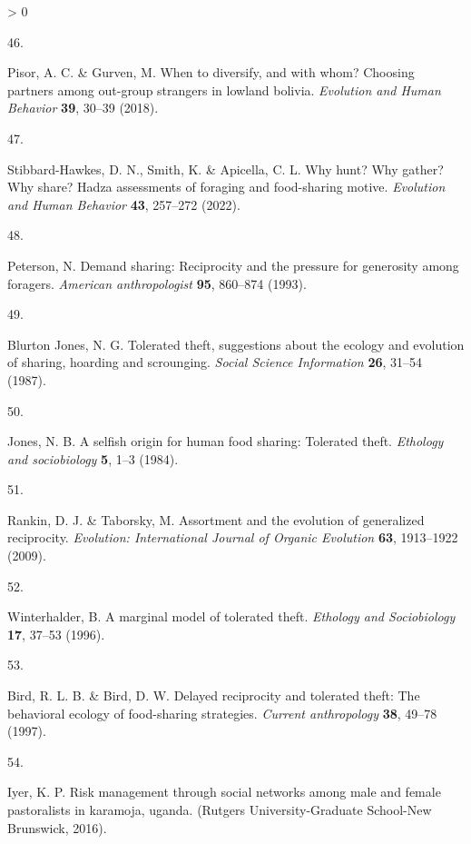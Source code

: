 \documentclass[
]{article}
\newlength{\cslhangindent}
\newlength{\csllabelwidth}
\newenvironment{CSLReferences}[2] %
 {%
  \setlength{\parindent}{0pt}
  \ifodd #1 \everypar{\setlength{\hangindent}{\cslhangindent}}\ignorespaces\fi
  \ifnum #2 > 0
  \setlength{\parskip}{#2\baselineskip}
  \fi
 }%
 {}
\newcommand{\CSLLeftMargin}[1]{\parbox[t]{\csllabelwidth}{#1}}
\newcommand{\CSLRightInline}[1]{\parbox[t]{\linewidth - \csllabelwidth}{#1}\break}
\begin{document}
\begin{CSLReferences}{0}{0}
\leavevmode\hypertarget{ref-pisor2018diversify}{}%
\CSLLeftMargin{46. }
\CSLRightInline{Pisor, A. C. \& Gurven, M. When to diversify, and with whom? Choosing partners among out-group strangers in lowland bolivia. \emph{Evolution and Human Behavior} \textbf{39}, 30--39 (2018).}

\leavevmode\hypertarget{ref-stibbard2022hunt}{}%
\CSLLeftMargin{47. }
\CSLRightInline{Stibbard-Hawkes, D. N., Smith, K. \& Apicella, C. L. Why hunt? Why gather? Why share? Hadza assessments of foraging and food-sharing motive. \emph{Evolution and Human Behavior} \textbf{43}, 257--272 (2022).}

\leavevmode\hypertarget{ref-peterson1993demand}{}%
\CSLLeftMargin{48. }
\CSLRightInline{Peterson, N. Demand sharing: Reciprocity and the pressure for generosity among foragers. \emph{American anthropologist} \textbf{95}, 860--874 (1993).}

\leavevmode\hypertarget{ref-blurton1987tolerated}{}%
\CSLLeftMargin{49. }
\CSLRightInline{Blurton Jones, N. G. Tolerated theft, suggestions about the ecology and evolution of sharing, hoarding and scrounging. \emph{Social Science Information} \textbf{26}, 31--54 (1987).}

\leavevmode\hypertarget{ref-jones1984selfish}{}%
\CSLLeftMargin{50. }
\CSLRightInline{Jones, N. B. A selfish origin for human food sharing: Tolerated theft. \emph{Ethology and sociobiology} \textbf{5}, 1--3 (1984).}

\leavevmode\hypertarget{ref-rankin2009assortment}{}%
\CSLLeftMargin{51. }
\CSLRightInline{Rankin, D. J. \& Taborsky, M. Assortment and the evolution of generalized reciprocity. \emph{Evolution: International Journal of Organic Evolution} \textbf{63}, 1913--1922 (2009).}

\leavevmode\hypertarget{ref-winterhalder1996marginal}{}%
\CSLLeftMargin{52. }
\CSLRightInline{Winterhalder, B. A marginal model of tolerated theft. \emph{Ethology and Sociobiology} \textbf{17}, 37--53 (1996).}

\leavevmode\hypertarget{ref-bird1997delayed}{}%
\CSLLeftMargin{53. }
\CSLRightInline{Bird, R. L. B. \& Bird, D. W. Delayed reciprocity and tolerated theft: The behavioral ecology of food-sharing strategies. \emph{Current anthropology} \textbf{38}, 49--78 (1997).}

\leavevmode\hypertarget{ref-iyer2016risk}{}%
\CSLLeftMargin{54. }
\CSLRightInline{Iyer, K. P. Risk management through social networks among male and female pastoralists in karamoja, uganda. (Rutgers University-Graduate School-New Brunswick, 2016).}


\end{CSLReferences}
\end{document}

